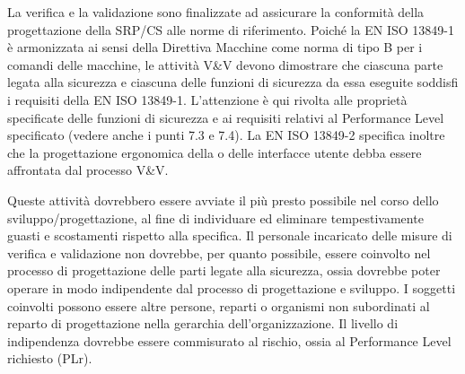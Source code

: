 La verifica e la validazione sono finalizzate ad assicurare la conformità della progettazione della SRP/CS alle norme di riferimento. Poiché la EN ISO 13849-1 è armonizzata ai sensi della Direttiva Macchine come norma di tipo B per i comandi delle macchine, le attività V\&V devono dimostrare che ciascuna parte legata alla sicurezza e ciascuna delle funzioni di sicurezza da essa eseguite soddisfi i requisiti della EN ISO 13849-1. L'attenzione è qui rivolta alle proprietà specificate delle funzioni di sicurezza e ai requisiti relativi al Performance Level specificato (vedere anche i punti 7.3 e 7.4). La EN ISO 13849-2 specifica inoltre che la progettazione ergonomica della o delle interfacce utente debba essere affrontata dal processo V\&V.

Queste attività dovrebbero essere avviate il più presto possibile nel corso dello sviluppo/progettazione, al fine di individuare ed eliminare tempestivamente guasti e scostamenti rispetto alla specifica. Il personale incaricato delle misure di verifica e validazione non dovrebbe, per quanto possibile, essere coinvolto nel processo di progettazione delle parti legate alla sicurezza, ossia dovrebbe poter operare in modo indipendente dal processo di progettazione e sviluppo. I soggetti coinvolti possono essere altre persone, reparti o organismi non subordinati al reparto di progettazione nella gerarchia dell'organizzazione. Il livello di indipendenza dovrebbe essere commisurato al rischio, ossia al Performance Level richiesto (PLr).

